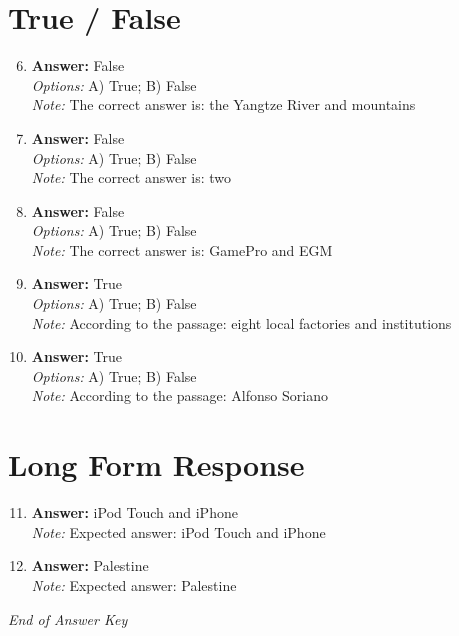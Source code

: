 \documentclass[12pt]{article}
\begin{document}
\section*{True / False}
\begin{enumerate}[label=\arabic*.]
\setcounter{enumi}{5}
\item \textbf{Answer:} False
\\ \textit{Options:} A) True; B) False
\\ \textit{Note:} The correct answer is: the Yangtze River and mountains
\item \textbf{Answer:} False
\\ \textit{Options:} A) True; B) False
\\ \textit{Note:} The correct answer is: two
\item \textbf{Answer:} False
\\ \textit{Options:} A) True; B) False
\\ \textit{Note:} The correct answer is: GamePro and EGM
\item \textbf{Answer:} True
\\ \textit{Options:} A) True; B) False
\\ \textit{Note:} According to the passage: eight local factories and institutions
\item \textbf{Answer:} True
\\ \textit{Options:} A) True; B) False
\\ \textit{Note:} According to the passage: Alfonso Soriano
\end{enumerate}

\section*{Long Form Response}
\begin{enumerate}[label=\arabic*.]
\setcounter{enumi}{10}
\item \textbf{Answer:} iPod Touch and iPhone
\\ \textit{Note:} Expected answer: iPod Touch and iPhone
\item \textbf{Answer:} Palestine
\\ \textit{Note:} Expected answer: Palestine
\end{enumerate}

\vfill
\noindent\textit{End of Answer Key}
\end{document}

